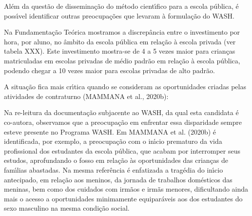 \documentclass[
12pt,		%
openright,	%
twoside,  %
a4paper,			%
chapter=TITLE,		%
english,			%
french,				%
spanish,			%
brazil				%
]{USPSC-classe/USPSC}
\begin{document}
Al\'em da quest\~ao de dissemina\c{c}\~ao do m\'etodo cient\'{\i}fico para a escola p\'ublica, \'e poss\'{\i}vel identificar outras preocupa\c{c}\~oes que levaram \`a formula\c{c}\~ao do WASH.




Na Fundamenta\c{c}\~ao Te\'orica mostramos a discrep\^ancia entre o investimento por hora, por aluno, no \^ambito da escola p\'ublica em rela\c{c}\~ao \`a escola privada (ver tabela XXX). Este investimento mostra-se de 4 a 5 vezes maior para crian\c{c}as matriculadas em escolas privadas de m\'edio padr\~ao em rela\c{c}\~ao \`a escola p\'ublica, podendo chegar a 10 vezes maior para escolas privadas de alto padr\~ao.




A situa\c{c}\~ao fica mais cr\'{\i}tica quando se consideram as oportunidades criadas pelas atividades de contraturno  (MAMMANA et al., 2020b):





\noindent\begin{center}\mbox{\centering{}}\end{center}


Na re-leitura da documenta\c{c}\~ao subjacente ao WASH, da qual esta candidata \'e co-autora, observamos que a preocupa\c{c}\~ao em enfrentar essa disparidade sempre esteve presente no Programa WASH. Em  MAMMANA et al. (2020b) \'e identificada, por exemplo, a preocupa\c{c}\~ao com o in\'{\i}cio prematuro da vida profissional dos estudantes da escola p\'ublica, que acabam por interromper seus estudos, aprofundando o fosso em rela\c{c}\~ao \`as oportunidades das crian\c{c}as de fam\'{\i}lias abastadas. Na mesma refer\^encia \'e enfatizada a trag\'edia do in\'{\i}cio antecipado, em rela\c{c}\~ao aos meninos, da jornada de trabalhos dom\'esticos das meninas, bem como dos cuidados com irm\~aos e irm\~as menores, dificultando ainda mais o acesso a oportunidades minimamente equipar\'aveis aos dos estudantes do sexo masculino na mesma condi\c{c}\~ao social.
\end{document}

